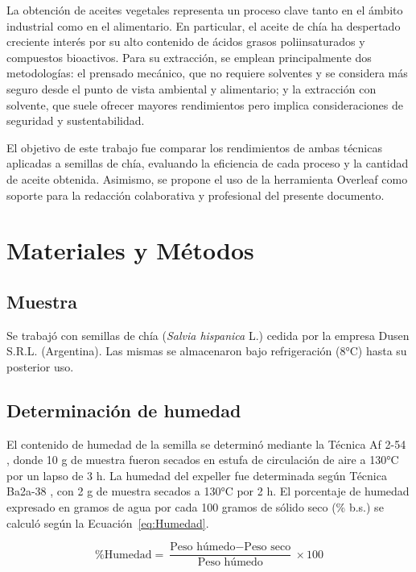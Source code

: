 \documentclass[12pt,a4paper]{article}
\begin{document}
La obtención de aceites vegetales representa un proceso clave tanto en el ámbito industrial como en el alimentario. En particular, el aceite de chía ha despertado creciente interés por su alto contenido de ácidos grasos poliinsaturados y compuestos bioactivos. Para su extracción, se emplean principalmente dos metodologías: el prensado mecánico, que no requiere solventes y se considera más seguro desde el punto de vista ambiental y alimentario; y la extracción con solvente, que suele ofrecer mayores rendimientos pero implica consideraciones de seguridad y sustentabilidad.

El objetivo de este trabajo fue comparar los rendimientos de ambas técnicas aplicadas a semillas de chía, evaluando la eficiencia de cada proceso y la cantidad de aceite obtenida. Asimismo, se propone el uso de la herramienta Overleaf como soporte para la redacción colaborativa y profesional del presente documento.



\section{Materiales y Métodos}

\subsection{Muestra}

Se trabajó con semillas de chía (\textit{Salvia hispanica} L.) cedida por la empresa Dusen S.R.L. (Argentina). Las mismas se almacenaron bajo refrigeración (8°C) hasta su posterior uso.

\subsection{Determinación de humedad}

El contenido de humedad de la semilla se determinó mediante la Técnica Af 2-54 \citep{aocs1998}, donde 10 g de muestra fueron secados en estufa de circulación de aire a 130°C por un lapso de 3 h. La humedad del expeller fue determinada según Técnica Ba2a-38 \citep{aocs1998}, con 2 g de muestra secados a 130°C por 2 h. El porcentaje de humedad expresado en gramos de agua por cada 100 gramos de sólido seco (\% b.s.) se calculó según la Ecuación~\ref{eq:Humedad}.


\begin{equation}
\% \text{Humedad} = \frac{\text{Peso húmedo} - \text{Peso seco}}{\text{Peso húmedo}} \times 100
\label{eq:Humedad}
\end{equation}
\end{document}
